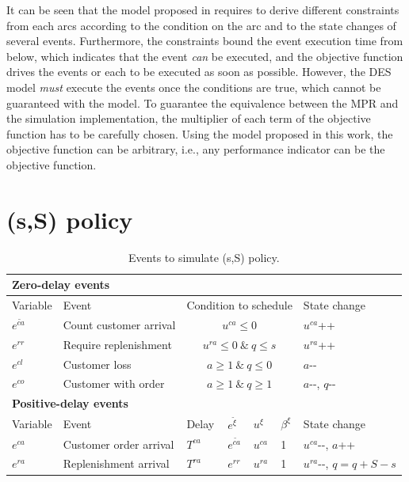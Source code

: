 \documentclass[]{interact}
\theoremstyle{plain}%
\theoremstyle{definition}
\theoremstyle{remark}
\begin{document}
It can be seen that the model proposed in \cite{chan2008optimization} requires to derive different constraints from each arcs according to the condition on the arc and to the state changes of several events. Furthermore, the constraints bound the event execution time from below, which indicates that the event \textit{can} be executed, and the objective function drives the events or each to be executed as soon as possible. However, the DES model \textit{must} execute the events once the conditions are true, which cannot be guaranteed with the model. To guarantee the equivalence between the MPR  and the simulation implementation, the multiplier of each term of the objective function has to be carefully chosen. Using the model proposed in this work, the objective function can be arbitrary, i.e., any performance indicator can be the objective function.


\section*{(s,S) policy}
\begin{table}[h]
	\begin{tabular}{lllllll} 
		\multicolumn{7}{l}{\textbf{Zero-delay events}}\\ \hline
		Variable&Event &  \multicolumn{4}{c}{Condition to schedule} & State change\\\hline
		$e^{\tilde{ca}}$ &Count customer arrival  &  \multicolumn{4}{c}{$u^{ca}\le 0$} & $u^{ca}${\footnotesize++} \\
		$e^{rr}$ & Require replenishment &  \multicolumn{4}{c}{$u^{ra}\le 0\ \&\ q\le s $} & $u^{ra}${\footnotesize++} \\
		$e^{cl}$ & Customer loss &  \multicolumn{4}{c}{$a\ge 1\ \&\ q\le0 $} & $a${\small-}{\small-}\\
		$e^{co}$ & Customer with order &  \multicolumn{4}{c}{$a\ge 1\ \&\ q\ge1 $} & $a${\small-}{\small-}, $q${\small-}{\small-} \\
		\multicolumn{7}{l}{\textbf{Positive-delay events}}\\ \hline
		Variable&Event 		   & Delay& $e^{\tilde{\xi}}$& $u^{\xi}$ &$\beta^{\xi}$& State change\\\hline
		$e^{ca}$&Customer order arrival & $T^{ca}$& $e^{\tilde{ca}}$&  $u^{ca}$&1&  $u^{ca}${\small-}{\small-}, $a${\footnotesize++}\\	
		$e^{ra}$&Replenishment arrival & $T^{ra}$& $e^{rr}$&  $u^{ra}$&1&  $u^{ra}${\small-}{\small-}, $q=q+S-s$\\	
		\hline
	\end{tabular}
	\caption{Events to simulate (s,S) policy.}
	\label{tab:sSpolicy}
\end{table}
\end{document}
